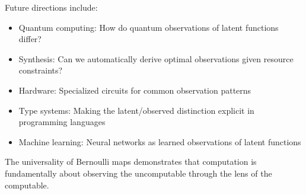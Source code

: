 \documentclass[11pt,final,hidelinks]{article}
\begin{document}
Future directions include:
\begin{itemize}
    \item Quantum computing: How do quantum observations of latent functions differ?
    \item Synthesis: Can we automatically derive optimal observations given resource constraints?
    \item Hardware: Specialized circuits for common observation patterns
    \item Type systems: Making the latent/observed distinction explicit in programming languages
    \item Machine learning: Neural networks as learned observations of latent functions
\end{itemize}

The universality of Bernoulli maps demonstrates that computation is fundamentally about observing the uncomputable through the lens of the computable.




\end{document}
